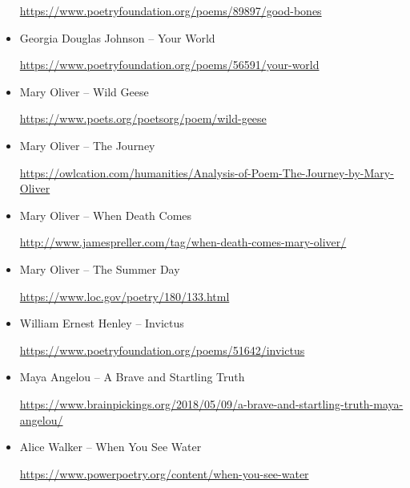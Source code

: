 \documentclass[12pt, openany, letterpaper]{memoir}
\begin{document}
\begin{itemize}
	\hyperref[https://www.poetryfoundation.org/poems/89897/good-bones]{https://www.poetryfoundation.org/poems/89897/good-bones}
	
	\item Georgia Douglas Johnson -- Your World
	
	\hyperref[https://www.poetryfoundation.org/poems/56591/your-world]{https://www.poetryfoundation.org/poems/56591/your-world}
	
	\item Mary Oliver -- Wild Geese
	
	\hyperref[https://www.poets.org/poetsorg/poem/wild-geese]{https://www.poets.org/poetsorg/poem/wild-geese}
	
	\item Mary Oliver -- The Journey
	
	\hyperref[https://owlcation.com/humanities/Analysis-of-Poem-The-Journey-by-Mary-Oliver]{https://owlcation.com/humanities/Analysis-of-Poem-The-Journey-by-Mary-Oliver}
	
	\item Mary Oliver -- When Death Comes
	
	\hyperref[http://www.jamespreller.com/tag/when-death-comes-mary-oliver/]{http://www.jamespreller.com/tag/when-death-comes-mary-oliver/}
	
	\item Mary Oliver -- The Summer Day
	
	\hyperref[https://www.loc.gov/poetry/180/133.html]{https://www.loc.gov/poetry/180/133.html}
	
	\item William Ernest Henley -- Invictus
	
	\hyperref[https://www.poetryfoundation.org/poems/51642/invictus]{https://www.poetryfoundation.org/poems/51642/invictus}
	
	\item Maya Angelou -- A Brave and Startling Truth
	
	\hyperref[https://www.brainpickings.org/2018/05/09/a-brave-and-startling-truth-maya-angelou/]{https://www.brainpickings.org/2018/05/09/a-brave-and-startling-truth-maya-angelou/}
	
	\item Alice Walker -- When You See Water
	
	\hyperref[https://www.powerpoetry.org/content/when-you-see-water]{https://www.powerpoetry.org/content/when-you-see-water}
\end{itemize}
\end{document}
